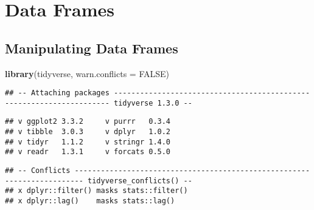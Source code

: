 \documentclass[
]{book}
\newenvironment{Shaded}{\begin{snugshade}}{\end{snugshade}}
\newcommand{\DataTypeTok}[1]{\textcolor[rgb]{0.13,0.29,0.53}{#1}}
\newcommand{\KeywordTok}[1]{\textcolor[rgb]{0.13,0.29,0.53}{\textbf{#1}}}
\newcommand{\NormalTok}[1]{#1}
\newcommand{\OtherTok}[1]{\textcolor[rgb]{0.56,0.35,0.01}{#1}}
\begin{document}
\cleardoublepage

\hypertarget{part-data-frames}{%
\part{Data Frames}\label{part-data-frames}}

\hypertarget{manipulating-data-frames}{%
\chapter{Manipulating Data Frames}\label{manipulating-data-frames}}

\begin{Shaded}
\begin{Highlighting}[]
\KeywordTok{library}\NormalTok{(tidyverse, }\DataTypeTok{warn.conflicts =} \OtherTok{FALSE}\NormalTok{)}
\end{Highlighting}
\end{Shaded}

\begin{verbatim}
## -- Attaching packages --------------------------------------------------------------------- tidyverse 1.3.0 --
\end{verbatim}

\begin{verbatim}
## v ggplot2 3.3.2     v purrr   0.3.4
## v tibble  3.0.3     v dplyr   1.0.2
## v tidyr   1.1.2     v stringr 1.4.0
## v readr   1.3.1     v forcats 0.5.0
\end{verbatim}

\begin{verbatim}
## -- Conflicts ------------------------------------------------------------------------ tidyverse_conflicts() --
## x dplyr::filter() masks stats::filter()
## x dplyr::lag()    masks stats::lag()
\end{verbatim}
\end{document}
